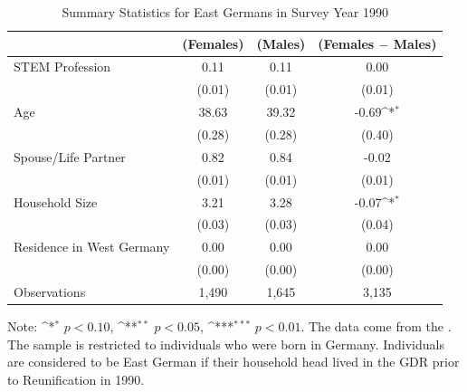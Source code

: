 \documentclass[a4paper, oneside, hyperfootnotes = false]{article}
\def\sym#1{\ifmmode^{#1}\else\(^{#1}\)\fi}
\begin{document}
{\begin{table}[ht]
	\caption{Summary Statistics for East Germans in Survey Year 1990}
	\label{tab:descr_summary_east}
	\begin{center}
		\begin{tabular}{l*{3}{c}}
			\toprule
			& (Females) & (Males) & (Females $-$ Males) \\
			\midrule
			STEM Profession & 0.11  & 0.11  &   0.00     \\
			&   (0.01)  & (0.01) & (0.01) \\
			\addlinespace
			Age         &   38.63   &  39.32  &  -0.69\sym{*}     \\
			&     (0.28) &        (0.28)         &      (0.40) \\
			\addlinespace
			Spouse/Life Partner &  0.82      &  0.84  &    -0.02    \\
			&      (0.01)&          (0.01)&         (0.01) \\
			\addlinespace
			Household Size      &  3.21   &  3.28   &   -0.07\sym{*}       \\
			&          (0.03)&       (0.03)        &      (0.04)\\
			\addlinespace
			Residence in West Germany&  0.00   &   0.00  &  0.00         \\
			&         (0.00) &       (0.00)&  (0.00)\\
			\midrule
			Observations        &  1,490    &    1,645     &      3,135             \\
			\bottomrule
		\end{tabular}
		
		\vspace{2mm}
		
		\parbox{10cm}{
			\linespread{1}\footnotesize Note: \sym{*} \(p<0.10\), \sym{**} \(p<0.05\), \sym{***} \(p<0.01\). The data come from the \cite{SOEP2023}. The sample is restricted to individuals who were born in Germany. Individuals are considered to be East German if their household head lived in the GDR prior to Reunification in 1990.}
		
	\end{center}
\end{table}

}
\end{document}

